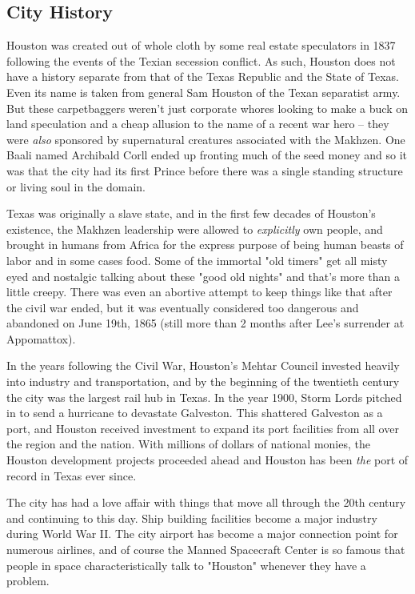 \subsection{City History}

\hspace{\parindent} Houston was created out of whole cloth by some real estate speculators in 1837 following the events of the Texian secession conflict. As such, Houston does not have a history separate from that of the Texas Republic and the State of Texas. Even its name is taken from general Sam Houston of the Texan separatist army. But these carpetbaggers weren't just corporate whores looking to make a buck on land speculation and a cheap allusion to the name of a recent war hero -- they were \textit{also} sponsored by supernatural creatures associated with the Makhzen. One Baali named Archibald Corll ended up fronting much of the seed money and so it was that the city had its first Prince before there was a single standing structure or living soul in the domain.

Texas was originally a slave state, and in the first few decades of Houston's existence, the Makhzen leadership were allowed to \textit{explicitly} own people, and brought in humans from Africa for the express purpose of being human beasts of labor and in some cases food. Some of the immortal "old timers" get all misty eyed and nostalgic talking about these "good old nights" and that's more than a little creepy. There was even an abortive attempt to keep things like that after the civil war ended, but it was eventually considered too dangerous and abandoned on June 19th, 1865 (still more than 2 months after Lee's surrender at Appomattox).

In the years following the Civil War, Houston's Mehtar Council invested heavily into industry and transportation, and by the beginning of the twentieth century the city was the largest rail hub in Texas. In the year 1900, Storm Lords pitched in to send a hurricane to devastate Galveston. This shattered Galveston as a port, and Houston received investment to expand its port facilities from all over the region and the nation. With millions of dollars of national monies, the Houston development projects proceeded ahead and Houston has been \textit{the} port of record in Texas ever since.

The city has had a love affair with things that move all through the 20th century and continuing to this day. Ship building facilities become a major industry during World War II. The city airport has become a major connection point for numerous airlines, and of course the Manned Spacecraft Center is so famous that people in space characteristically talk to "Houston" whenever they have a problem.

